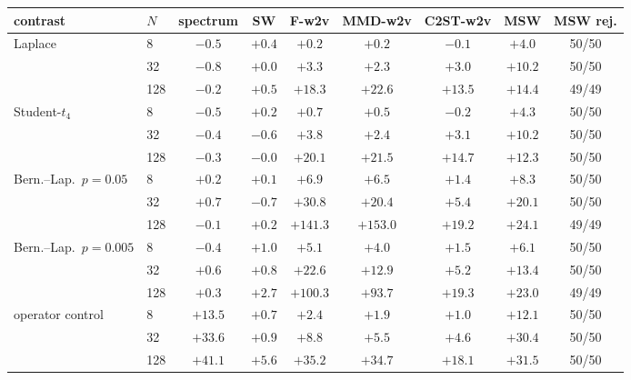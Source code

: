 \begin{tabular}{llccccccc}
\toprule
contrast & $N$ & spectrum & SW & F-w2v & MMD-w2v & C2ST-w2v & MSW & MSW rej. \\
\midrule
Laplace & 8 & $-0.5$ & $+0.4$ & $+0.2$ & $+0.2$ & $-0.1$ & $\mathbf{+4.0}$ & 50/50 \\
 & 32 & $-0.8$ & $+0.0$ & $+3.3$ & $+2.3$ & $+3.0$ & $\mathbf{+10.2}$ & 50/50 \\
 & 128 & $-0.2$ & $+0.5$ & $+18.3$ & $\mathbf{+22.6}$ & $+13.5$ & $+14.4$ & 49/49 \\
Student-$t_4$ & 8 & $-0.5$ & $+0.2$ & $+0.7$ & $+0.5$ & $-0.2$ & $\mathbf{+4.3}$ & 50/50 \\
 & 32 & $-0.4$ & $-0.6$ & $+3.8$ & $+2.4$ & $+3.1$ & $\mathbf{+10.2}$ & 50/50 \\
 & 128 & $-0.3$ & $-0.0$ & $+20.1$ & $\mathbf{+21.5}$ & $+14.7$ & $+12.3$ & 50/50 \\
Bern.--Lap.\ $p{=}0.05$ & 8 & $+0.2$ & $+0.1$ & $+6.9$ & $+6.5$ & $+1.4$ & $\mathbf{+8.3}$ & 50/50 \\
 & 32 & $+0.7$ & $-0.7$ & $\mathbf{+30.8}$ & $+20.4$ & $+5.4$ & $+20.1$ & 50/50 \\
 & 128 & $-0.1$ & $+0.2$ & $+141.3$ & $\mathbf{+153.0}$ & $+19.2$ & $+24.1$ & 49/49 \\
Bern.--Lap.\ $p{=}0.005$ & 8 & $-0.4$ & $+1.0$ & $+5.1$ & $+4.0$ & $+1.5$ & $\mathbf{+6.1}$ & 50/50 \\
 & 32 & $+0.6$ & $+0.8$ & $\mathbf{+22.6}$ & $+12.9$ & $+5.2$ & $+13.4$ & 50/50 \\
 & 128 & $+0.3$ & $+2.7$ & $\mathbf{+100.3}$ & $+93.7$ & $+19.3$ & $+23.0$ & 49/49 \\
operator control & 8 & $\mathbf{+13.5}$ & $+0.7$ & $+2.4$ & $+1.9$ & $+1.0$ & $+12.1$ & 50/50 \\
 & 32 & $\mathbf{+33.6}$ & $+0.9$ & $+8.8$ & $+5.5$ & $+4.6$ & $+30.4$ & 50/50 \\
 & 128 & $\mathbf{+41.1}$ & $+5.6$ & $+35.2$ & $+34.7$ & $+18.1$ & $+31.5$ & 50/50 \\
\bottomrule
\end{tabular}
